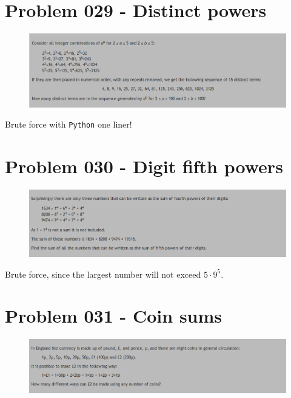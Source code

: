 \section{Problem 029 - Distinct powers}
\begin{prob}
	\begin{figure}[htb!]
		\begin{center}
			\includegraphics[scale = 0.4]{pic/029.png}
		\end{center}
	\end{figure}
\end{prob}
\begin{sol}
Brute force with \texttt{Python} one liner!
\end{sol}

\section{Problem 030 - Digit fifth powers}
\begin{prob}
	\begin{figure}[htb!]
		\begin{center}
			\includegraphics[scale = 0.4]{pic/030.png}
		\end{center}
	\end{figure}
\end{prob}
\begin{sol}
Brute force, since the largest number will not exceed $5 \cdot 9 ^5$.
\end{sol}

\section{Problem 031 - Coin sums}
\begin{prob}
	\begin{figure}[htb!]
		\begin{center}
			\includegraphics[scale = 0.4]{pic/031.png}
		\end{center}
	\end{figure}
\end{prob}

